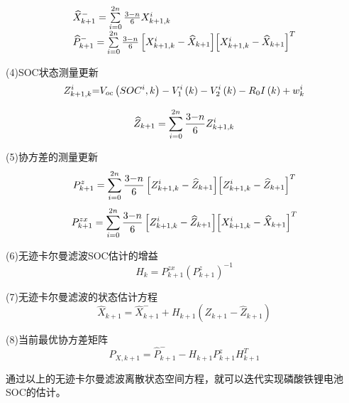 \begin{equation}
\begin{array}{l}
\widehat X_{k + 1}^ -  = \sum\limits_{i = 0}^{2n} {\frac{{3{\rm{ - }}n}}{6}X_{k + 1,k}^i} \\
\widehat P_{k + 1}^ -  = \sum\limits_{i = 0}^{2n} {\frac{{3{\rm{ - }}n}}{6}\left[ {X_{k + 1,k}^i - {{\widehat X}_{k + 1}}} \right]} {\left[ {X_{k + 1,k}^i - {{\widehat X}_{k + 1}}} \right]^T}
\end{array}
\end{equation}

(4)SOC状态测量更新
\begin{equation}
Z_{k + 1,k}^i{\rm{ = }}{V_{oc}}\left( {SO{C^i},k} \right) - V_1^i\left( k \right) - V_2^i\left( k \right) - {R_0}I\left( k \right) + w_k^i
\end{equation}

\begin{equation}
{\widehat Z_{k + 1}} = \sum\limits_{i = 0}^{2n} {\frac{{3{\rm{ - }}n}}{6}Z_{k + 1,k}^i} 
\end{equation}

(5)协方差的测量更新
\begin{equation}
P_{k + 1}^z = \sum\limits_{i = 0}^{2n} {\frac{{3{\rm{ - }}n}}{6}\left[ {Z_{k + 1,k}^i - {{\widehat Z}_{k + 1}}} \right]} {\left[ {Z_{k + 1,k}^i - {{\widehat Z}_{k + 1}}} \right]^T}
\end{equation}
\begin{equation}
P_{k + 1}^{zx} = \sum\limits_{i = 0}^{2n} {\frac{{3{\rm{ - }}n}}{6}\left[ {Z_{k + 1,k}^i - {{\widehat Z}_{k + 1}}} \right]} {\left[ {X_{k + 1,k}^i - {{\widehat X}_{k + 1}}} \right]^T}
\end{equation}

(6)无迹卡尔曼滤波SOC估计的增益
\begin{equation}
{H_k} = P_{k + 1}^{zx}{\left( {P_{k + 1}^z} \right)^{ - 1}}
\end{equation} 

(7)无迹卡尔曼滤波的状态估计方程
\begin{equation}
{\widehat X_{k + 1}} = \widehat X_{k + 1}^ -  + {H_{k + 1}}({Z_{k + 1}} - {\widehat Z_{k + 1}})
\end{equation} 

(8)当前最优协方差矩阵
\begin{equation}
{P_{X,k + 1}} = \widehat P_{k + 1}^ -  - {H_{k + 1}}P_{k + 1}^zH_{k + 1}^T
\end{equation} 

通过以上的无迹卡尔曼滤波离散状态空间方程，就可以迭代实现磷酸铁锂电池SOC的估计。

